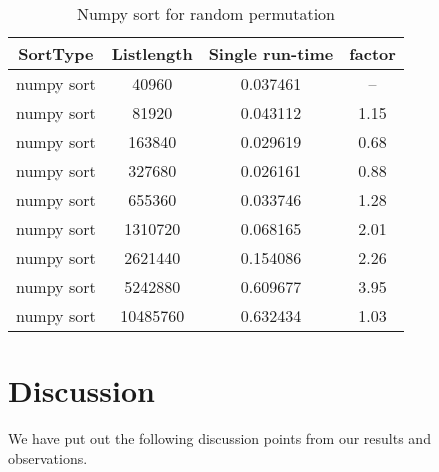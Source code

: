 \documentclass[sigconf, nonacm, natbib, screen, balance=False]{acmart}
\begin{document}
\begin{table}[ht]
\begin{center}
\begin{tabular}{|c|c|c|c|} 
\hline
\textbf{SortType} & 	\textbf{Listlength} & 	\textbf{Single run-time} & \textbf{factor} \\ 
\hline
numpy sort & 	40960 & 	0.037461 & --	 \\ 
numpy sort & 	81920 & 	0.043112 & 	1.15 \\ 
numpy sort & 	163840 & 	0.029619 & 	0.68 \\ 
numpy sort & 	327680 & 	0.026161 & 	0.88 \\ 
numpy sort & 	655360 & 	0.033746 & 	1.28 \\ 
numpy sort & 	1310720 & 	0.068165 & 	2.01 \\ 
numpy sort & 	2621440 & 	0.154086 & 	2.26 \\ 
numpy sort & 	5242880 & 	0.609677 & 	3.95 \\ 
numpy sort & 	10485760 & 	0.632434 & 	1.03 \\ 

\hline
\end{tabular}
\end{center}
\caption{Numpy sort for random permutation }
\label{tab:table3}
\end{table}

\section{Discussion}\label{sec:discussion}
We have put out the following discussion points from our results and observations.
\end{document}
